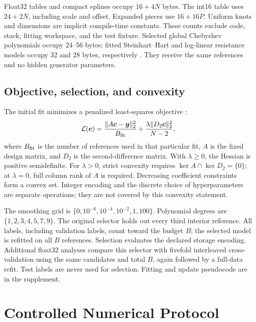 \documentclass[journal,twoside,web]{ieeecolor}
\begin{document}
Float32 tables and compact splines occupy $16+4N$ bytes. The int16 table uses $24+2N$, including scale and offset. Expanded pieces use $16+16P$. Uniform knots and dimensions are implicit compile-time constants. These counts exclude code, stack, fitting workspace, and the test fixture. Selected global Chebyshev polynomials occupy 24--56 bytes; fitted Steinhart--Hart and log-linear resistance models occupy 32 and 28 bytes, respectively \cite{steinhart}. They receive the same references and no hidden generator parameters.

\subsection{Objective, selection, and convexity}
\normalcolor
The initial fit minimizes a penalized least-squares objective \cite{eilers}:
\begin{equation}
 \mathcal L(\boldsymbol c)=\frac{\|A\boldsymbol c-\boldsymbol y\|_2^2}{B_{\rm fit}}
 +\frac{\lambda\|D_2\boldsymbol c\|_2^2}{N-2},
 \label{eq:fit}
\end{equation}
where $B_{\rm fit}$ is the number of references used in that particular fit, $A$ is the fixed design matrix, and $D_2$ is the second-difference matrix. With $\lambda\geq0$, the Hessian is positive semidefinite. For $\lambda>0$, strict convexity requires $\ker A\cap\ker D_2=\{0\}$; at $\lambda=0$, full column rank of $A$ is required. Decreasing coefficient constraints form a convex set. Integer encoding and the discrete choice of hyperparameters are separate operations; they are not covered by this convexity statement.

The smoothing grid is $\{0,10^{-6},10^{-4},10^{-2},1,100\}$. Polynomial degrees are $\{1,2,3,4,5,7,9\}$. The original selector holds out every third interior reference. All labels, including validation labels, count toward the budget $B$; the selected model is refitted on all $B$ references. Selection evaluates the declared storage encoding. Additional float32 analyses compare this selector with fivefold interleaved cross-validation using the same candidates and total $B$, again followed by a full-data refit. Test labels are never used for selection. Fitting and update pseudocode are in the supplement.

\section{Controlled Numerical Protocol}
\end{document}
